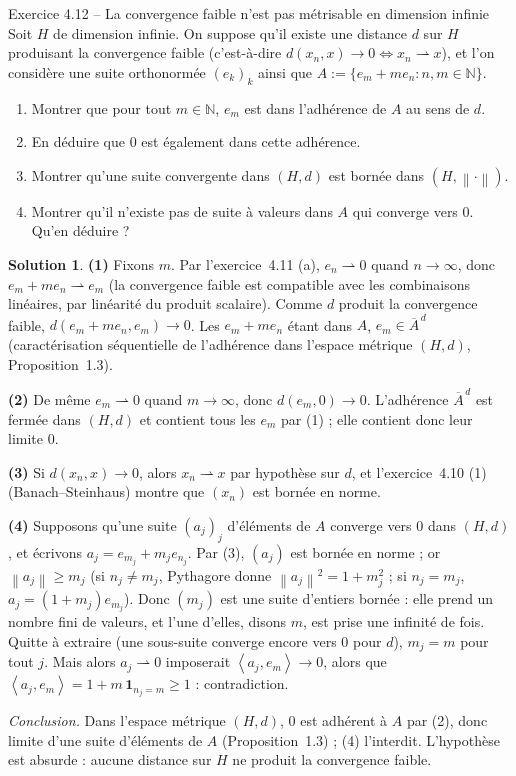 \documentclass[11pt,a4paper]{article}
\newcommand{\N}{\mathbb{N}}
\newcommand{\adh}[1]{\overline{#1}}
\newcommand{\norm}[1]{\left\|#1\right\|}
\newcommand{\ie}{c'est-à-dire}
\newcommand{\ps}[2]{\left\langle #1,#2\right\rangle}
\theoremstyle{definition}
\newtheorem*{solution}{Solution}
\begin{document}
\begin{exo}{Exercice 4.12 -- La convergence faible n'est pas métrisable en dimension infinie}
Soit $H$ de dimension infinie. On suppose qu'il existe une distance $d$ sur $H$ produisant la convergence faible (\ie{} $d(x_n,x)\to0\iff x_n\rightharpoonup x$), et l'on considère une suite orthonormée $(e_k)_k$ ainsi que $A:=\{e_m+me_n:n,m\in\N\}$.
\begin{enumerate}[label=(\arabic*)]
  \item Montrer que pour tout $m\in\N$, $e_m$ est dans l'adhérence de $A$ au sens de $d$.
  \item En déduire que $0$ est également dans cette adhérence.
  \item Montrer qu'une suite convergente dans $(H,d)$ est bornée dans $(H,\norm\cdot)$.
  \item Montrer qu'il n'existe pas de suite à valeurs dans $A$ qui converge vers $0$. Qu'en déduire ?
\end{enumerate}
\end{exo}

\begin{solution}
\noindent\textbf{(1)} Fixons $m$. Par l'exercice~4.11 (a), $e_n\rightharpoonup0$ quand $n\to\infty$, donc $e_m+me_n\rightharpoonup e_m$ (la convergence faible est compatible avec les combinaisons linéaires, par linéarité du produit scalaire). Comme $d$ produit la convergence faible, $d(e_m+me_n,e_m)\to0$. Les $e_m+me_n$ étant dans $A$, $e_m\in\adh A^{\,d}$ (caractérisation séquentielle de l'adhérence dans l'espace métrique $(H,d)$, Proposition~1.3).

\medskip
\noindent\textbf{(2)} De même $e_m\rightharpoonup0$ quand $m\to\infty$, donc $d(e_m,0)\to0$. L'adhérence $\adh A^{\,d}$ est fermée dans $(H,d)$ et contient tous les $e_m$ par (1) ; elle contient donc leur limite $0$.

\medskip
\noindent\textbf{(3)} Si $d(x_n,x)\to0$, alors $x_n\rightharpoonup x$ par hypothèse sur $d$, et l'exercice~4.10 (1) (Banach--Steinhaus) montre que $(x_n)$ est bornée en norme.

\medskip
\noindent\textbf{(4)} Supposons qu'une suite $(a_j)_j$ d'éléments de $A$ converge vers $0$ dans $(H,d)$, et écrivons $a_j=e_{m_j}+m_je_{n_j}$. Par (3), $(a_j)$ est bornée en norme ; or $\norm{a_j}\ge m_j$ (si $n_j\ne m_j$, Pythagore donne $\norm{a_j}^2=1+m_j^2$ ; si $n_j=m_j$, $a_j=(1+m_j)e_{m_j}$). Donc $(m_j)$ est une suite d'entiers bornée : elle prend un nombre fini de valeurs, et l'une d'elles, disons $m$, est prise une infinité de fois. Quitte à extraire (une sous-suite converge encore vers $0$ pour $d$), $m_j=m$ pour tout $j$. Mais alors $a_j\rightharpoonup0$ imposerait $\ps{a_j}{e_m}\to0$, alors que $\ps{a_j}{e_m}=1+m\,\mathbf 1_{n_j=m}\ge1$ : contradiction.

\emph{Conclusion.} Dans l'espace métrique $(H,d)$, $0$ est adhérent à $A$ par (2), donc limite d'une suite d'éléments de $A$ (Proposition~1.3) ; (4) l'interdit. L'hypothèse est absurde : aucune distance sur $H$ ne produit la convergence faible.
\end{solution}
\end{document}
